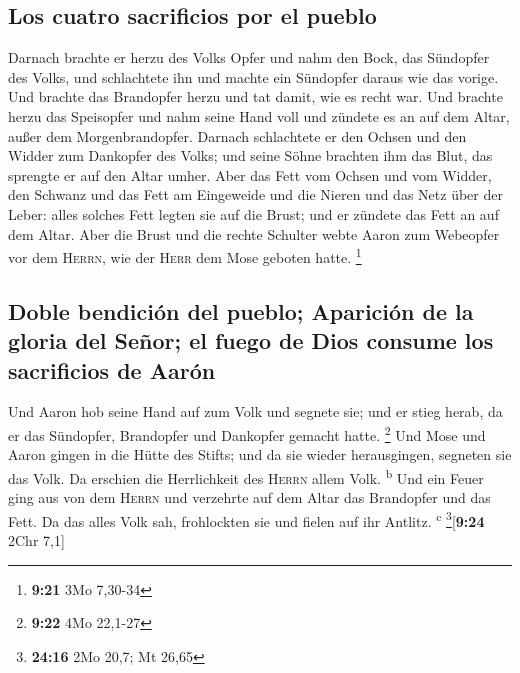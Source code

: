 \hypertarget{los-cuatro-sacrificios-por-el-pueblo}{%
\subsection{Los cuatro sacrificios por el
pueblo}\label{los-cuatro-sacrificios-por-el-pueblo}}

 Darnach brachte er herzu des Volks Opfer und nahm den
Bock, das Sündopfer des Volks, und schlachtete ihn und machte ein
Sündopfer daraus wie das vorige.  Und brachte das
Brandopfer herzu und tat damit, wie es recht war.  Und
brachte herzu das Speisopfer und nahm seine Hand voll und zündete es an
auf dem Altar, außer dem Morgenbrandopfer.  Darnach
schlachtete er den Ochsen und den Widder zum Dankopfer des Volks; und
seine Söhne brachten ihm das Blut, das sprengte er auf den Altar umher.
 Aber das Fett vom Ochsen und vom Widder, den Schwanz und
das Fett am Eingeweide und die Nieren und das Netz über der Leber:
 alles solches Fett legten sie auf die Brust; und er
zündete das Fett an auf dem Altar.  Aber die Brust und
die rechte Schulter webte Aaron zum Webeopfer vor dem \textsc{Herrn},
wie der \textsc{Herr} dem Mose geboten hatte. \footnote{\textbf{9:21}
  3Mo 7,30-34}

\hypertarget{doble-bendiciuxf3n-del-pueblo-apariciuxf3n-de-la-gloria-del-seuxf1or-el-fuego-de-dios-consume-los-sacrificios-de-aaruxf3n}{%
\subsection{Doble bendición del pueblo; Aparición de la gloria del
Señor; el fuego de Dios consume los sacrificios de
Aarón}\label{doble-bendiciuxf3n-del-pueblo-apariciuxf3n-de-la-gloria-del-seuxf1or-el-fuego-de-dios-consume-los-sacrificios-de-aaruxf3n}}

 Und Aaron hob seine Hand auf zum Volk und segnete sie;
und er stieg herab, da er das Sündopfer, Brandopfer und Dankopfer
gemacht hatte. \footnote{\textbf{9:22} 4Mo 22,1-27}  Und
Mose und Aaron gingen in die Hütte des Stifts; und da sie wieder
herausgingen, segneten sie das Volk. Da erschien die Herrlichkeit des
\textsc{Herrn} allem Volk. \textsuperscript{b}  Und ein
Feuer ging aus von dem \textsc{Herrn} und verzehrte auf dem Altar das
Brandopfer und das Fett. Da das alles Volk sah, frohlockten sie und
fielen auf ihr Antlitz. \textsuperscript{c} \footnote{\textbf{24:16} 2Mo
  20,7; Mt 26,65}{[}\textbf{9:24} 2Chr 7,1{]}

